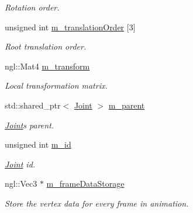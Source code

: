 \begin{DoxyCompactItemize}
\begin{DoxyCompactList}\small\item\em Rotation order. \end{DoxyCompactList}\item 
unsigned int \hyperlink{struct_joint_a1cde67c8162c77ab2473490a83ef25ad}{m\+\_\+translation\+Order} \mbox{[}3\mbox{]}\hypertarget{struct_joint_a1cde67c8162c77ab2473490a83ef25ad}{}\label{struct_joint_a1cde67c8162c77ab2473490a83ef25ad}

\begin{DoxyCompactList}\small\item\em Root translation order. \end{DoxyCompactList}\item 
ngl\+::\+Mat4 \hyperlink{struct_joint_ac91e46f8eb9e481d5899bb1b0750c726}{m\+\_\+transform}\hypertarget{struct_joint_ac91e46f8eb9e481d5899bb1b0750c726}{}\label{struct_joint_ac91e46f8eb9e481d5899bb1b0750c726}

\begin{DoxyCompactList}\small\item\em Local transformation matrix. \end{DoxyCompactList}\item 
std\+::shared\+\_\+ptr$<$ \hyperlink{struct_joint}{Joint} $>$ \hyperlink{struct_joint_afaa8a0a853821e77f9388b9fcab01ce3}{m\+\_\+parent}\hypertarget{struct_joint_afaa8a0a853821e77f9388b9fcab01ce3}{}\label{struct_joint_afaa8a0a853821e77f9388b9fcab01ce3}

\begin{DoxyCompactList}\small\item\em \hyperlink{struct_joint}{Joint}\textquotesingle{}s parent. \end{DoxyCompactList}\item 
unsigned int \hyperlink{struct_joint_a325d56db900122a3449a4a06a0da9214}{m\+\_\+id}\hypertarget{struct_joint_a325d56db900122a3449a4a06a0da9214}{}\label{struct_joint_a325d56db900122a3449a4a06a0da9214}

\begin{DoxyCompactList}\small\item\em \hyperlink{struct_joint}{Joint} id. \end{DoxyCompactList}\item 
ngl\+::\+Vec3 $\ast$ \hyperlink{struct_joint_ae1f10dc85083c3e80c9c24389033e2cb}{m\+\_\+frame\+Data\+Storage}\hypertarget{struct_joint_ae1f10dc85083c3e80c9c24389033e2cb}{}\label{struct_joint_ae1f10dc85083c3e80c9c24389033e2cb}

\begin{DoxyCompactList}\small\item\em Store the vertex data for every frame in animation. \end{DoxyCompactList}\end{DoxyCompactItemize}


